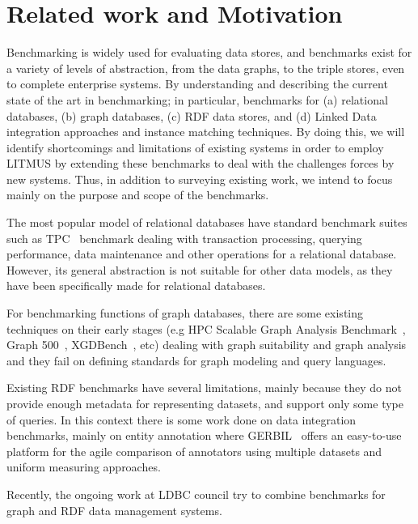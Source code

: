 \documentclass{llncs}
\begin{document}
\section{Related work and Motivation}\label{relwork}

    Benchmarking is widely used for evaluating data stores, and benchmarks exist for a variety of levels of abstraction, from the data graphs, to the triple stores, even to complete enterprise systems.
    By understanding and describing the current state of the art in benchmarking; in particular, benchmarks for (a) relational databases, (b) graph databases, (c) RDF data stores, and (d) Linked Data integration approaches and instance matching techniques.
    By doing this, we will identify shortcomings and limitations of existing systems in order to employ LITMUS by extending these benchmarks to deal with the challenges forces by new systems.
    Thus, in addition to surveying existing work, we intend to focus mainly on the purpose and scope of the benchmarks.
    
    The most popular model of relational databases have standard benchmark suites such as TPC~\cite{Nambiar2011} benchmark dealing with transaction processing, querying performance, data maintenance and other operations for a relational database.
    However, its general abstraction is not suitable for other data models, as they have been specifically made for relational databases.
    
    For benchmarking functions of graph databases, there are some existing techniques on their early stages (e.g HPC Scalable Graph Analysis Benchmark~\cite{Dominguez-Sal:2010:SGD:1927585.1927590}, Graph 500~\cite{murphy2010introducing}, XGDBench~\cite{conf/cloudcom/DayarathnaS12}, etc) dealing with graph suitability and graph analysis and they fail on defining standards for graph modeling and query languages.
    
    Existing RDF benchmarks have several limitations, mainly because they do not provide enough metadata for representing datasets, and support only some type of queries. 
    In this context there is some work done on data integration benchmarks, mainly on entity annotation where GERBIL~\cite{Usbeck:2015:GGE:2736277.2741626} offers an easy-to-use platform for the agile comparison of annotators using multiple datasets and uniform measuring approaches.
    
    Recently, the ongoing work at LDBC council \cite{DBLP:journals/sigmod/AnglesBLF0ENMKT14} try to combine benchmarks for graph and RDF data management systems.
    
\end{document}
